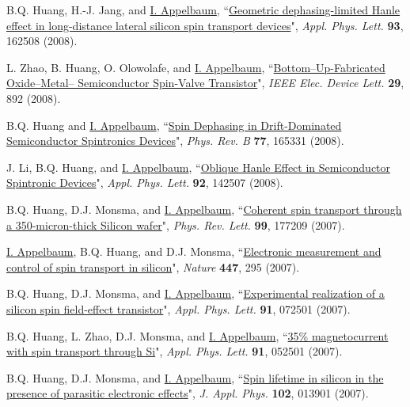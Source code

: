 \documentclass[paper=letter,fontsize=11pt]{scrartcl} %
\newcommand{\PaperEntry}[7]{
		\noindent #1, ``\href{#7}{#2}", \textit{#3} \textbf{#4}, #5 (#6).}
\begin{document}
\begin{etaremune}
\item\PaperEntry{B.Q. Huang, H.-J. Jang, and \underline{I. Appelbaum}}{Geometric dephasing-limited Hanle effect in long-distance lateral silicon spin transport devices}{Appl. Phys. Lett.}{93}{162508}{2008}{http://dx.doi.org/10.1063/1.3006333}

\item\PaperEntry{L. Zhao, B. Huang, O. Olowolafe, and \underline{I. Appelbaum}}{Bottom–Up-Fabricated Oxide–Metal– Semiconductor Spin-Valve Transistor}{IEEE Elec. Device Lett.}{29}{892}{2008}{http://dx.doi.org/10.1109/LED.2008.2001177}


\item\PaperEntry{B.Q. Huang and \underline{I. Appelbaum}}{Spin Dephasing in Drift-Dominated Semiconductor Spintronics Devices}{Phys. Rev. B}{77}{165331}{2008}{http://dx.doi.org/10.1103/PhysRevB.77.165331}

\item\PaperEntry{J. Li, B.Q. Huang, and \underline{I. Appelbaum}}{Oblique Hanle Effect in Semiconductor Spintronic Devices}{Appl. Phys. Lett.}{92}{142507}{2008}{http://dx.doi.org/10.1063/1.2907497}

\item\PaperEntry{B.Q. Huang, D.J. Monsma, and \underline{I. Appelbaum}}{Coherent spin transport through a 350-micron-thick Silicon wafer}{Phys. Rev. Lett.}{99}{177209}{2007}{http://dx.doi.org/10.1103/PhysRevLett.99.177209}

\item\PaperEntry{\underline{I. Appelbaum}, B.Q. Huang, and D.J. Monsma}{Electronic measurement and control of spin transport in silicon}{Nature}{447}{295}{2007}{http://dx.doi.org/10.1038/nature05803}

\item\PaperEntry{B.Q. Huang, D.J. Monsma, and \underline{I. Appelbaum}}{Experimental realization of a silicon spin field-effect transistor}{Appl. Phys. Lett.}{91}{072501}{2007}{http://dx.doi.org/10.1063/1.2770656}

\item\PaperEntry{B.Q. Huang, L. Zhao, D.J. Monsma, and \underline{I. Appelbaum}}{35\% magnetocurrent with spin transport through Si}{Appl. Phys. Lett.}{91}{052501}{2007}{http://dx.doi.org/10.1063/1.2767198}

\item\PaperEntry{B.Q. Huang, D.J. Monsma, and \underline{I. Appelbaum}}{Spin lifetime in silicon in the presence of parasitic electronic effects}{J. Appl. Phys.}{102}{013901}{2007}{http://dx.doi.org/10.1063/1.2750411}


\end{etaremune}
\end{document}
